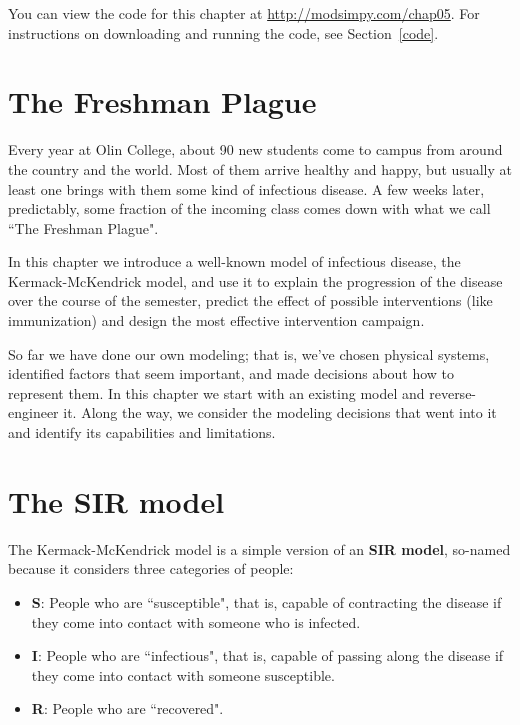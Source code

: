 \documentclass[12pt]{book}
\theoremstyle{exercise}
\begin{document}
You can view the code for this chapter at \url{http://modsimpy.com/chap05}.  For instructions on downloading and running the code, see Section~\ref{code}.


\section{The Freshman Plague}

Every year at Olin College, about 90 new students come to campus from around the country and the world.  Most of them arrive healthy and happy, but usually at least one brings with them some kind of infectious disease.  A few weeks later, predictably, some fraction of the incoming class comes down with what we call ``The Freshman Plague".

In this chapter we introduce a well-known model of infectious disease, the Kermack-McKendrick model, and use it to explain the progression of the disease over the course of the semester, predict the effect of possible interventions (like immunization) and design the most effective intervention campaign.

So far we have done our own modeling; that is, we've chosen physical systems, identified factors that seem important, and made decisions about how to represent them.  In this chapter we start with an existing model and reverse-engineer it.  Along the way, we consider the modeling decisions that went into it and identify its capabilities and limitations.


\section{The SIR model}

The Kermack-McKendrick model is a simple version of an {\bf SIR model}, so-named because it considers three categories of people:

\begin{itemize}

\item {\bf S}: People who are ``susceptible", that is, capable of contracting the disease if they come into contact with someone who is infected.

\item {\bf I}: People who are ``infectious", that is, capable of passing along the disease if they come into contact with someone susceptible.

\item {\bf R}: People who are ``recovered".

\end{itemize}
 
\end{document}
